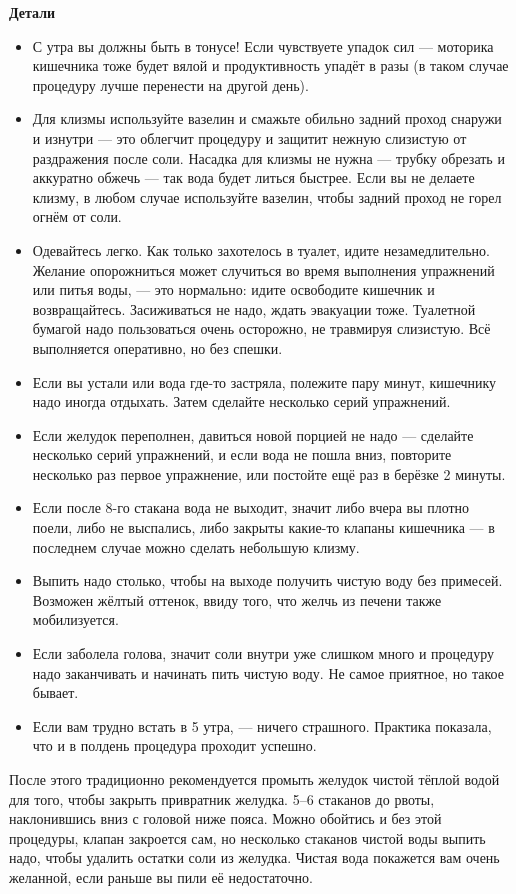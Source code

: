 \textbf{Детали}
\begin{itemize}

\item С утра вы должны быть в тонусе! Если чувствуете упадок сил — моторика кишечника тоже будет вялой и продуктивность упадёт в разы (в таком случае процедуру лучше перенести на другой день).
\item Для клизмы используйте вазелин и смажьте обильно задний проход снаружи и изнутри — это облегчит процедуру и защитит нежную слизистую от раздражения после соли. Насадка для клизмы не нужна — трубку обрезать и аккуратно обжечь — так вода будет литься быстрее. Если вы не делаете клизму, в любом случае используйте вазелин, чтобы задний проход не горел огнём от соли.
\item Одевайтесь легко. Как только захотелось в туалет, идите незамедлительно. Желание опорожниться может случиться во время выполнения упражнений или питья воды, — это нормально: идите освободите кишечник и возвращайтесь. Засиживаться не надо, ждать эвакуации тоже. Туалетной бумагой надо пользоваться очень осторожно, не травмируя слизистую. Всё выполняется оперативно, но без спешки.
\item Если вы устали или вода где-то застряла, полежите пару минут, кишечнику надо иногда отдыхать. Затем сделайте несколько серий упражнений.
\item Если желудок переполнен, давиться новой порцией не надо — сделайте несколько серий упражнений, и если вода не пошла вниз, повторите несколько раз первое упражнение, или постойте ещё раз в берёзке 2 минуты.
\item Если после 8-го стакана вода не выходит, значит либо вчера вы плотно поели, либо не выспались, либо закрыты какие-то клапаны кишечника — в последнем случае можно сделать небольшую клизму.
\item Выпить надо столько, чтобы на выходе получить чистую воду без примесей. Возможен жёлтый оттенок, ввиду того, что желчь из печени также мобилизуется.
\item Если заболела голова, значит соли внутри уже слишком много и процедуру надо заканчивать и начинать пить чистую воду. Не самое приятное, но такое бывает.
\item Если вам трудно встать в 5 утра, — ничего страшного. Практика показала, что и в полдень процедура проходит успешно.

\end{itemize}

После этого традиционно рекомендуется промыть желудок чистой тёплой водой для того, чтобы закрыть привратник желудка. 5–6 стаканов до рвоты, наклонившись вниз с головой ниже пояса. Можно обойтись и без этой процедуры, клапан закроется сам, но несколько стаканов чистой воды выпить надо, чтобы удалить остатки соли из желудка. Чистая вода покажется вам очень желанной, если раньше вы пили её недостаточно.

